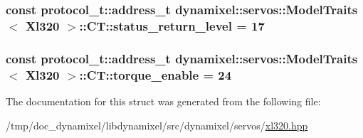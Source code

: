 \subsubsection[{status\+\_\+return\+\_\+level}]{\setlength{\rightskip}{0pt plus 5cm}const {\bf protocol\+\_\+t\+::address\+\_\+t} {\bf dynamixel\+::servos\+::\+Model\+Traits}$<$ {\bf Xl320} $>$\+::C\+T\+::status\+\_\+return\+\_\+level = 17\hspace{0.3cm}{\ttfamily [static]}}\label{structdynamixel_1_1servos_1_1_model_traits_3_01_xl320_01_4_1_1_c_t_aa9d72b396ee7d508e32ba5a68b55feda}
\hypertarget{structdynamixel_1_1servos_1_1_model_traits_3_01_xl320_01_4_1_1_c_t_aab87f65d081b09743aa8266380957437}{}
\subsubsection[{torque\+\_\+enable}]{\setlength{\rightskip}{0pt plus 5cm}const {\bf protocol\+\_\+t\+::address\+\_\+t} {\bf dynamixel\+::servos\+::\+Model\+Traits}$<$ {\bf Xl320} $>$\+::C\+T\+::torque\+\_\+enable = 24\hspace{0.3cm}{\ttfamily [static]}}\label{structdynamixel_1_1servos_1_1_model_traits_3_01_xl320_01_4_1_1_c_t_aab87f65d081b09743aa8266380957437}


The documentation for this struct was generated from the following file\+:\begin{DoxyCompactItemize}
\item 
/tmp/doc\+\_\+dynamixel/libdynamixel/src/dynamixel/servos/\hyperlink{xl320_8hpp}{xl320.\+hpp}\end{DoxyCompactItemize}
